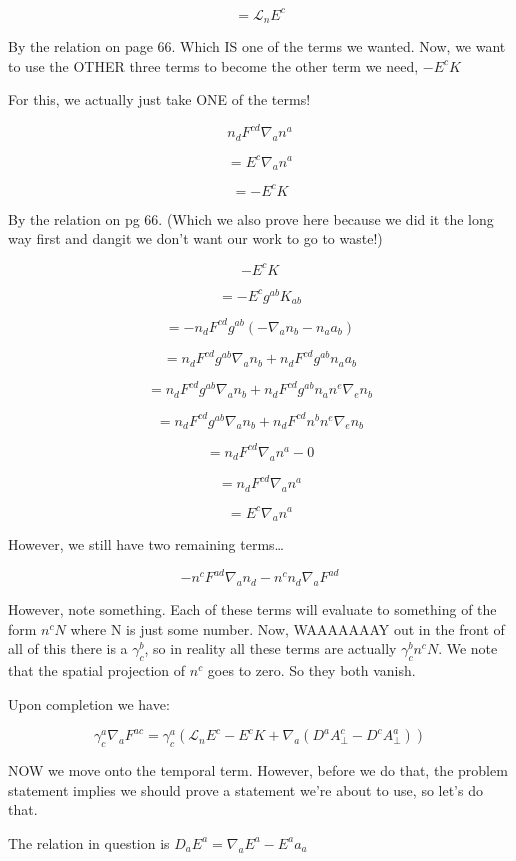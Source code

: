 \documentclass[landscape,letterpaper,10pt,english]{article}
\begin{document}
\[ = \mathcal{L}_n E^c \]

By the relation on page 66. Which IS one of the terms we wanted. Now, we
want to use the OTHER three terms to become the other term we need,
\(-E^cK\)

    For this, we actually just take ONE of the terms!

\[ n_d F^{cd} \nabla_a n^a \]

\[ = E^c \nabla_a n^a \]

\[ = - E^c K \]

By the relation on pg 66. (Which we also prove here because we did it
the long way first and dangit we don't want our work to go to waste!)

\[ -E^c K \]

\[ = -E^c g^{ab} K_{ab} \]

\[ = -n_d F^{cd} g^{ab} (-\nabla_a n_b - n_a a_b) \]

\[ = n_d F^{cd} g^{ab} \nabla_a n_b + n_d F^{cd} g^{ab} n_a a_b \]

\[ = n_d F^{cd} g^{ab} \nabla_a n_b + n_d F^{cd} g^{ab} n_a n^e \nabla_e n_b \]

\[ = n_d F^{cd} g^{ab} \nabla_a n_b + n_d F^{cd} n^b n^e \nabla_e n_b \]

\[ = n_d F^{cd} \nabla_a n^a - 0 \]

\[ = n_d F^{cd} \nabla_a n^a  \]

\[ = E^c \nabla_a n^a \]

    However, we still have two remaining terms\ldots{}

\[ - n^c F^{ad} \nabla_a n_d - n^c n_d \nabla_a F^{ad} \]

However, note something. Each of these terms will evaluate to something
of the form \(n^c N\) where N is just some number. Now, WAAAAAAAY out in
the front of all of this there is a \(\gamma^b_c\), so in reality all
these terms are actually \(\gamma^b_c n^c N\). We note that the spatial
projection of \(n^c\) goes to zero. So they both vanish.

    Upon completion we have:

\[\gamma^a_c \nabla_a F^{ac} = \gamma^a_c (\mathcal{L}_n E^c - E^c K + \nabla_a (D^a A^c_\perp - D^c A^a_\perp))\]

NOW we move onto the temporal term. However, before we do that, the
problem statement implies we should prove a statement we're about to
use, so let's do that.

    The relation in question is \(D_a E^a = \nabla_a E^a - E^a a_a\)
\end{document}
